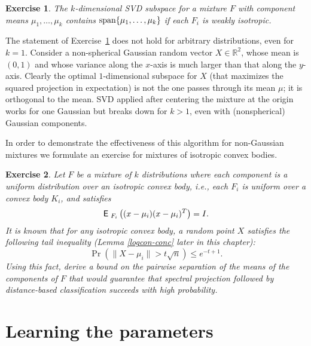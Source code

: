 \documentclass{book}
\newtheorem{exercise}{Exercise}
\numberwithin{exercise}{chapter}
\begin{document}
\begin{exercise}\label{svd.isotropic}
The $k$-dimensional SVD subspace for a mixture $F$ with component means $\mu_1, \ldots, \mu_k$ contains
$\hbox{span}\{\mu_1,\dots,\mu_k\}$ if each $F_i$ is weakly isotropic.
\end{exercise}

The statement of Exercise~\ref{svd.isotropic} does not hold for arbitrary distributions, even for $k=1$. Consider a non-spherical Gaussian random vector $X\in\mathbb R^2$, whose mean is $(0,1)$ and whose variance along the $x$-axis is much larger than that along the $y$-axis. Clearly the optimal $1$-dimensional subspace for $X$ (that maximizes the squared projection in expectation) is not the one passes through its mean $\mu$; it is orthogonal to the mean. SVD applied after centering the mixture at the origin works for one Gaussian but breaks down for $k > 1$, even with (nonspherical) Gaussian components.


In order to demonstrate the effectiveness of this algorithm for non-Gaussian mixtures we formulate an exercise for mixtures of
isotropic convex bodies.
\begin{exercise}
Let $F$ be a mixture of $k$ distributions where each component is a uniform distribution over an isotropic convex body,
i.e., each $F_i$ is uniform over a convex body $K_i$, and satisfies
\[
\hbox{{\sf E}\;}_{F_i} \left((x-\mu_i)(x-\mu_i)^T\right) = I.
\]
It is known that for any isotropic convex body, a random point $X$ satisfies the following tail inequality (Lemma \ref{logcon-conc} later
in this chapter):
\[
\Pr(\|X-\mu_i\| > t\sqrt{n}) \le e^{-t+1}.
\]
Using this fact, derive a bound on the pairwise separation of the means of the components of $F$ that would guarantee
that spectral projection followed by distance-based classification succeeds with high probability.
\end{exercise}

\section{Learning the parameters}\label{sec:learnmix}
\end{document}
